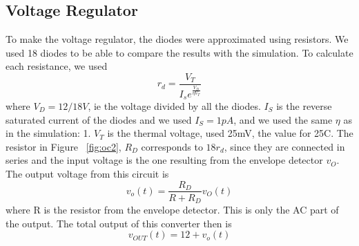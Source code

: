 \subsection{Voltage Regulator}
To make the voltage regulator, the diodes were approximated using resistors. We used 18 diodes to be able to compare the results with the simulation. To calculate each resistance, we used 
\begin{equation}
 r_d=\frac{V_T}{I_se^{\frac{V_D}{\eta V_T}}}
\end{equation}
where $V_D=12/18 V$, ie the voltage divided by all the diodes. $I_S$ is the reverse saturated current of the diodes and we used $I_S=1 pA$, and we used the same $\eta$ as in the simulation: 1. $V_T$ is the thermal voltage, used 25mV, the value for 25\textdegree C. The resistor in Figure ~\ref{fig:oc2}, $R_D$ corresponds to $18r_d$, since they are connected in series and the input voltage is the one resulting from the envelope detector $v_O$.\\
The output voltage from this circuit is 
\begin{equation}
    v_o(t)=\frac{R_D}{R+R_D}v_O(t)
\end{equation}
where R is the resistor from the envelope detector.
This is only the AC part of the output.
The total output of this converter then is
\begin{equation}
    v_{OUT}(t)=12+v_o(t)
\end{equation}
